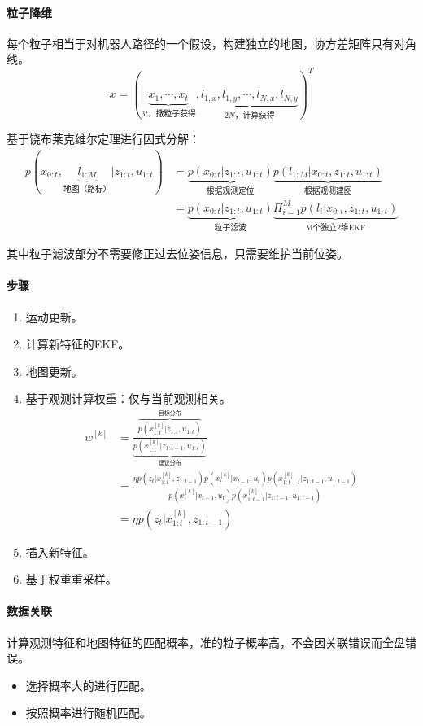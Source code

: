 \documentclass[
12pt, %
a4paper, 
oneside, %
headinclude,footinclude, %
]{scrartcl}
\begin{document}
\paragraph{粒子降维}
每个粒子相当于对机器人路径的一个假设，构建独立的地图，协方差矩阵只有对角线。
$$ x = (\underbrace{x_1, \cdots, x_t}_{3t\text{，撒粒子获得}}, \underbrace{l_{1, x}, l_{1, y}, \cdots, l_{N, x}, l_{N, y}}_{2N\text{，计算获得}})^T $$

基于饶布莱克维尔定理进行因式分解：
\begin{align*}
p(x_{0:t}, \underbrace{l_{1:M}}_{\text{地图（路标）}}|z_{1:t}, u_{1:t}) 
&= \underbrace{p(x_{0:t}|z_{1:t}, u_{1:t})}_{\text{根据观测定位}} \underbrace{p(l_{1:M}|x_{0:t}, z_{1:t}, u_{1:t})}_{\text{根据观测建图}} \\
&= \underbrace{p(x_{0:t}|z_{1:t}, u_{1:t})}_{\text{粒子滤波}} \underbrace{\Pi_{i = 1}^M p(l_i|x_{0:t}, z_{1:t}, u_{1:t})}_{\text{M个独立2维EKF}}
\end{align*}

其中粒子滤波部分不需要修正过去位姿信息，只需要维护当前位姿。
\paragraph{步骤}
\begin{enumerate}
\item 运动更新。
\item 计算新特征的EKF。
\item 地图更新。
\item 基于观测计算权重：仅与当前观测相关。
\begin{align*}
w^{[k]} &= \frac{\overbrace{p(x_{1:t}^{[k]}|z_{1:t}, u_{1:t})}^{\text{目标分布}}}{\underbrace{p(x_{1:t}^{[k]}|z_{1:t - 1}, u_{1:t})}_{\text{建议分布}}} \\
&= \frac{\eta p(z_t | x_{1:t}^{[k]}, z_{1:t - 1})p(x_t^{[k]}|x_{t - 1}, u_t)p(x_{1:t - 1}^{[k]}|z_{1:t - 1}, u_{1:t - 1})}{p(x_t^{[k]}|x_{t - 1}, u_t)p(x_{1:t - 1}^{[k]}|z_{1:t - 1}, u_{1:t - 1})} \\
&= \eta p(z_t|x_{1:t}^{[k]}, z_{1:t - 1})
\end{align*}
\item 插入新特征。
\item 基于权重重采样。
\end{enumerate}
\paragraph{数据关联}
计算观测特征和地图特征的匹配概率，准的粒子概率高，不会因关联错误而全盘错误。
\begin{itemize}
\item 选择概率大的进行匹配。
\item 按照概率进行随机匹配。
\end{itemize}
\end{document}
